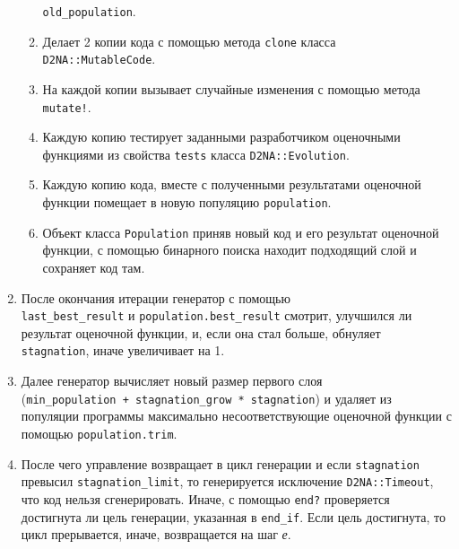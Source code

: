 \documentclass[utf8,a5paper,portrait,10pt]{eskdtext}
\begin{document}
\begin{enumerate}
\begin{enumerate}
                \texttt{old\_population}.
          \item Делает 2 копии кода с помощью метода \texttt{clone} класса
                \texttt{D2NA::MutableCode}.
          \item На каждой копии вызывает случайные изменения с помощью метода
                \texttt{mutate!}.
          \item Каждую копию тестирует заданными разработчиком оценочными
                функциями из свойства \texttt{tests} класса
                \texttt{D2NA::Evolution}.
          \item Каждую копию кода, вместе с полученными результатами оценочной
                функции помещает в новую популяцию \texttt{population}.
          \item Объект класса \texttt{Population} приняв новый код и его
                результат оценочной функции, с помощью бинарного поиска находит
                подходящий слой и сохраняет код там.
        \end{enumerate}
  \item После окончания итерации генератор с помощью\\
        \texttt{last\_best\_result} и \texttt{population.best\_result} смотрит,
        улучшился ли результат оценочной функции, и, если она стал больше,
        обнуляет \texttt{stagnation}, иначе увеличивает на 1.
  \item Далее генератор вычисляет новый размер первого слоя\\
        (\texttt{min\_population + stagnation\_grow * stagnation}) и удаляет из
        популяции программы максимально несоответствующие оценочной функции с
        помощью \texttt{population.trim}.
  \item После чего управление возвращает в цикл генерации и если
        \texttt{stagnation} превысил \texttt{stagnation\_limit}, то генерируется
        исключение \texttt{D2NA::Timeout}, что код нельзя сгенерировать.
        Иначе, с помощью \texttt{end?} проверяется достигнута ли цель генерации,
        указанная в \texttt{end\_if}. Если цель достигнута, то цикл прерывается,
        иначе, возвращается на шаг \textit{е}.
\end{enumerate}
\end{document}
